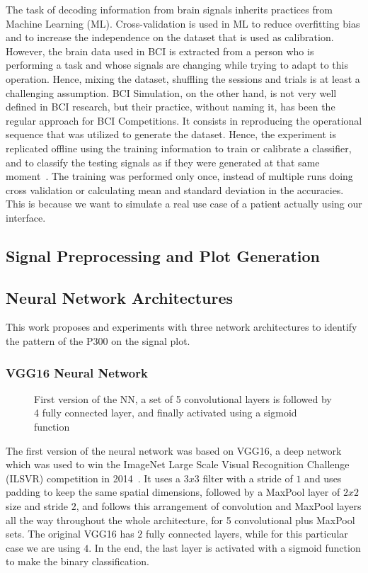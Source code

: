 \documentclass[conference]{IEEEtran}
\begin{document}
The task of decoding information from brain signals inherits practices from Machine Learning (ML). Cross-validation is used in ML to reduce overfitting bias and to increase the independence on the dataset that is used as calibration. However, the brain data used in BCI is extracted from a person who is performing a task and whose signals are changing while trying to adapt to this operation. Hence, mixing the dataset, shuffling the sessions and trials is at least a challenging assumption. BCI Simulation, on the other hand, is not very well defined in BCI research, but their practice, without naming it, has been the regular approach for BCI Competitions. It consists in reproducing the operational sequence that was utilized to generate the dataset. Hence, the experiment is replicated offline using the training information to train or calibrate a classifier, and to classify the testing signals as if they were generated at that same moment~\cite{ramele.2018}. The training was performed only once, instead of multiple runs doing cross validation or calculating mean and standard deviation in the accuracies. This is because we want to simulate a real use case of a patient actually using our interface.

\subsection{Signal Preprocessing and Plot Generation}

\subsection{Neural Network Architectures}

This work proposes and experiments with three network architectures to identify the pattern of the P300 on the signal plot.

\subsubsection{VGG16 Neural Network}

\begin{figure*}[!t]

\caption[VGG16 Neural Network]{First version of the NN, a set of 5 convolutional layers is followed by 4 fully connected layer, and finally activated using a sigmoid function}
\label{fig:nnv1}
\end{figure*}


The first version of the neural network was based on VGG16, a deep network which was used to win the ImageNet Large Scale Visual Recognition Challenge (ILSVR) competition in 2014~\cite{ilsvr2014}. It uses a $3x3$ filter with a stride of $1$ and uses padding to keep the same spatial dimensions, followed by a MaxPool layer of $2x2$ size and stride $2$, and follows this arrangement of convolution and MaxPool layers all the way throughout the whole architecture, for 5 convolutional plus MaxPool sets. The original VGG16 has $2$ fully connected layers, while for this particular case we are using $4$. In the end, the last layer is activated with a sigmoid function to make the binary classification. 
\end{document}
